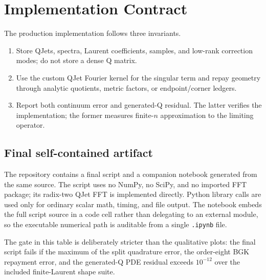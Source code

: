 \documentclass[10pt,leqno]{article}
\numberwithin{equation}{section}
\theoremstyle{plain}
\theoremstyle{definition}
\theoremstyle{remark}
\begin{document}
\section{Implementation Contract}
The production implementation follows three invariants.
\begin{enumerate}
\item Store QJets, spectra, Laurent coefficients, samples, and low-rank correction modes; do not store a dense Q matrix.
\item Use the custom QJet Fourier kernel for the singular term and repay geometry through analytic quotients, metric factors, or endpoint/corner ledgers.
\item Report both continuum error and generated-Q residual.  The latter verifies the implementation; the former measures finite-$n$ approximation to the limiting operator.
\end{enumerate}

\subsection{Final self-contained artifact}
The repository contains a final script and a companion notebook generated from the same source.  The script uses no NumPy, no SciPy, and no imported FFT package; its radix-two QJet FFT is implemented directly.  Python library calls are used only for ordinary scalar math, timing, and file output.  The notebook embeds the full script source in a code cell rather than delegating to an external module, so the executable numerical path is auditable from a single \texttt{.ipynb} file.
\par\noindent{}\par
The gate in this table is deliberately stricter than the qualitative plots: the final script fails if the maximum of the split quadrature error, the order-eight BGK repayment error, and the generated-Q PDE residual exceeds $10^{-12}$ over the included finite-Laurent shape suite.
\end{document}
